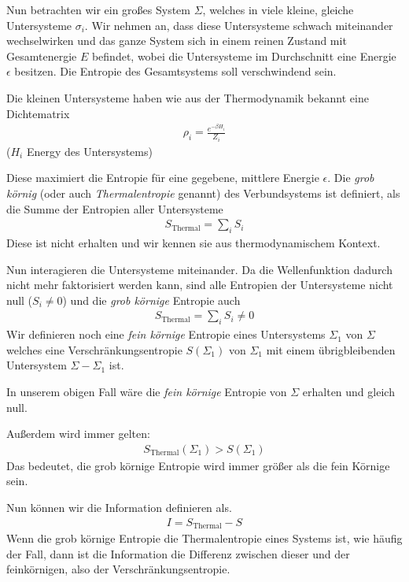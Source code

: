 \documentclass[ngerman]{scrartcl}
\begin{document}
Nun betrachten wir ein großes System $\Sigma$, welches in viele kleine, gleiche Untersysteme $\sigma_i$. Wir nehmen an, dass diese Untersysteme schwach miteinander wechselwirken und das ganze System sich in einem reinen Zustand mit Gesamtenergie $E$ befindet, wobei die Untersysteme im Durchschnitt eine Energie $\epsilon$ besitzen. Die Entropie des Gesamtsystems soll verschwindend sein.

Die kleinen Untersysteme haben wie aus der Thermodynamik bekannt eine Dichtematrix
	\begin{align}
		\rho_i = \frac{e^{-\beta H_i}}{Z_i}
	\end{align}	
($H_i$ Energy des Untersystems)

Diese maximiert die Entropie für eine gegebene, mittlere Energie $\epsilon$.
Die \textit{grob körnig} (oder auch \textit{Thermalentropie} genannt) des Verbundsystems ist definiert, als die Summe der Entropien aller Untersysteme
	\begin{align}
		S_{\text{Thermal}} = \sum_i S_i 
	\end{align}
Diese ist nicht erhalten und wir kennen sie aus thermodynamischem Kontext.

Nun interagieren die Untersysteme miteinander. Da die Wellenfunktion dadurch nicht mehr faktorisiert werden kann, sind alle Entropien der Untersysteme nicht null ($S_i \neq 0$)
und die \textit{grob körnige} Entropie auch
	\begin{align*}
		S_{\text{Thermal}} = \sum_i S_i \neq 0
	\end{align*}
Wir definieren noch eine \textit{fein körnige} Entropie eines Untersystems $\Sigma_1$ von $\Sigma$ welches eine Verschränkungsentropie $S(\Sigma_1)$ von $\Sigma_1$ mit einem übrigbleibenden Untersystem $\Sigma-\Sigma_1$ ist.  

In unserem obigen Fall wäre die \textit{fein körnige} Entropie von $\Sigma$ erhalten und gleich null. 

Außerdem wird immer gelten:
	\begin{align}
		S_{\text{Thermal}}(\Sigma_1) > S(\Sigma_1)
	\end{align}
Das bedeutet, die grob körnige Entropie wird immer größer als die fein Körnige sein.

Nun können wir die Information definieren als.
	\begin{align}
		I = S_{\text{Thermal}} - S
	\end{align}
Wenn die grob körnige Entropie die Thermalentropie eines Systems ist, wie häufig der Fall, dann ist die Information die Differenz zwischen dieser und der feinkörnigen, also der Verschränkungsentropie.
\end{document}
